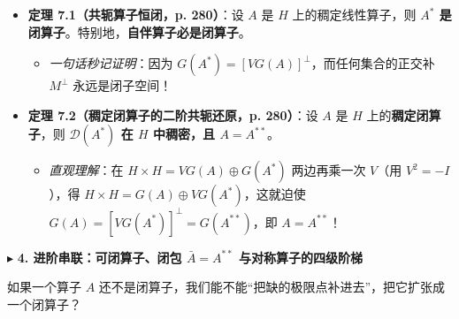 \documentclass[11pt,a4paper]{article}
\providecommand{\tightlist}{\setlength{\itemsep}{1.8pt}\setlength{\parskip}{0pt}}
\newcommand{\SubSubHeading}[1]{%
  \Needspace{6.5\baselineskip}\vspace{5.5pt}\noindent
  \textcolor{AccentMain}{\scriptsize$\blacktriangleright$}\hspace{4pt}%
  {\small\bfseries\color{AccentMain}#1}\par\nopagebreak[4]\vspace{2.5pt}%
}
\begin{document}
\begin{itemize}
\tightlist
\item
  \textbf{定理 7.1（共轭算子恒闭，p. 280）}：设 \(A\) 是 \(H\) 上的稠定线性算子，则 \textbf{\(A^*\) 是闭算子}。特别地，\textbf{自伴算子必是闭算子}。

  \begin{itemize}
  \tightlist
  \item
    \emph{一句话秒记证明}：因为 \(G(A^*) = [VG(A)]^\perp\)，而任何集合的正交补 \(M^\perp\) 永远是闭子空间！
  \end{itemize}
\item
  \textbf{定理 7.2（稠定闭算子的二阶共轭还原，p. 280）}：设 \(A\) 是 \(H\) 上的\textbf{稠定闭算子}，则 \textbf{\(\mathcal{D}(A^*)\) 在 \(H\) 中稠密，且 \(A = A^{**}\)}。

  \begin{itemize}
  \tightlist
  \item
    \emph{直观理解}：在 \(H \times H = VG(A) \oplus G(A^*)\) 两边再乘一次 \(V\)（用 \(V^2 = -I\)），得 \(H \times H = G(A) \oplus VG(A^*)\)，这就迫使 \(G(A) = [VG(A^*)]^\perp = G(A^{**})\)，即 \(A = A^{**}\)！
  \end{itemize}
\end{itemize}

\SubSubHeading{4. 进阶串联：可闭算子、闭包 \(\bar{A} = A^{**}\) 与对称算子的四级阶梯}

如果一个算子 \(A\) 还不是闭算子，我们能不能``把缺的极限点补进去''，把它扩张成一个闭算子？
\end{document}

